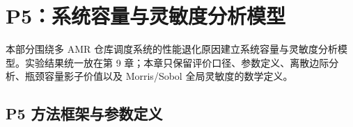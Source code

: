 \section{P5：系统容量与灵敏度分析模型}
本部分围绕多 AMR 仓库调度系统的性能退化原因建立系统容量与灵敏度分析模型。实验结果统一放在第 9 章；本章只保留评价口径、参数定义、离散边际分析、瓶颈容量影子价值以及 Morris/Sobol 全局灵敏度的数学定义。

\subsection{P5 方法框架与参数定义}






